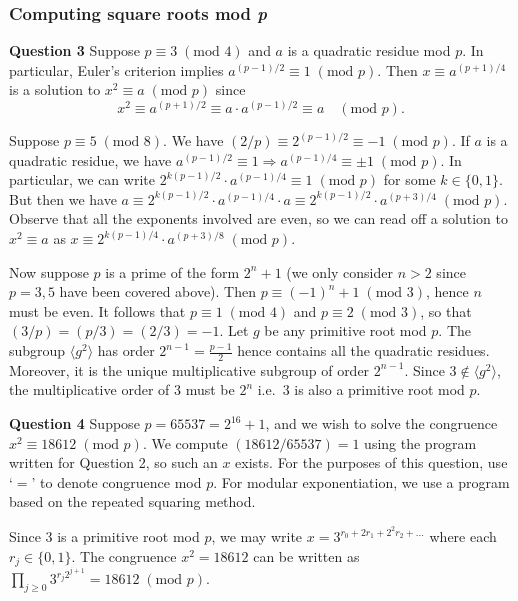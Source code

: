 \documentclass[12pt]{article}
\newcommand{\textmod}[1]{\;(\text{mod }#1)}
\newcommand{\mathmod}[1]{\quad(\text{mod }#1)}
\begin{document}
\subsubsection{Computing square roots mod \textit{p}}
\textbf{Question 3}\quad 
Suppose \(p\equiv 3\;(\text{mod }4)\) and \(a\) is a quadratic residue mod \(p\). In
particular, Euler's criterion implies \(a^{(p-1)/2}\equiv 1\textmod{p}\). Then \(x\equiv
a^{(p+1)/4}\) is a solution to \(x^2\equiv a\textmod{p}\) since
\[x^2 \equiv a^{(p+1)/2} \equiv a\cdot a^{(p-1)/2} \equiv a \mathmod{p}.\]

Suppose \(p\equiv 5\textmod{8}\). We have \((2/p) \equiv
2^{(p-1)/2}\equiv -1 \textmod{p}\). If \(a\) is a quadratic residue, we have
\(a^{(p-1)/2}\equiv 1 \Rightarrow a^{(p-1)/4}\equiv \pm 1 \textmod{p}\). In
particular, we can write \( 2^{k(p-1)/2} \cdot a^{(p-1)/4}\equiv 1 \textmod{p}\) for some \(k\in
\{0,1\}\). But then we have \(a \equiv 2^{k(p-1)/2} \cdot a^{(p-1)/4}\cdot a \equiv
2^{k(p-1)/2}\cdot a^{(p+3)/4} \textmod{p}\). Observe that all the exponents
involved are even, so we can read off a solution to \(x^2\equiv a\) as \(x\equiv
2^{k(p-1)/4}\cdot a^{(p+3)/8}\textmod{p}\).

\hfill 

Now suppose \(p\) is a prime of the form \(2^n+1\) (we only consider \(n>2\)
since \(p=3,5\) have been covered above). Then \(p\equiv (-1)^n+1\textmod{3}\),
hence \(n\) must be even. It follows that \(p\equiv 1\textmod{4}\) and \(p\equiv
2\textmod{3}\), so that \((3/p) = (p/3) = (2/3) = -1\). Let \(g\) be any
primitive root mod \(p\). The subgroup \(\langle g^2\rangle\) has order
\(2^{n-1}=\frac{p-1}{2}\) hence contains all the quadratic residues. Moreover,
it is the unique multiplicative subgroup of order \(2^{n-1}\). Since \(3\notin
\langle g^2\rangle\), the multiplicative order of \(3\) must be \(2^n\) i.e.\
\(3\) is also a primitive root mod \(p\). 

\textbf{Question 4}\quad
Suppose \(p=65537=2^{16}+1\), and we wish to solve the congruence \(x^2\equiv
18612 \textmod{p}\). We compute \((18612/65537)=1\) using the program written
for Question 2, so such an \(x\) exists. For the purposes of this question, use
`\(=\)' to denote congruence mod \(p\). For modular exponentiation, we use a
program based on the repeated squaring method.

Since \(3\) is a primitive root mod \(p\), we may write \(x =
3^{r_0+2r_1+2^2r_2+...}\) where each \(r_j\in \{0,1\}\). The congruence
\(x^2=18612\) can be written as \(\prod_{j\geq 0} 3^{r_j2^{j+1}} = 18612
\textmod{p}\). 
\end{document}
